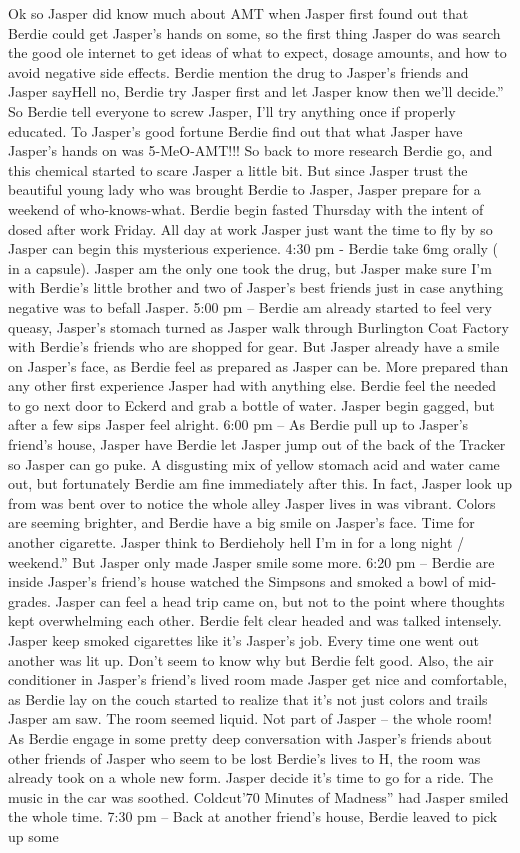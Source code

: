 \documentclass[12pt]{book}
\begin{document}
Ok so Jasper did know much about AMT when Jasper first found out that Berdie could get Jasper's hands on some, so the first thing Jasper do was search the good ole internet to get ideas of what to expect, dosage amounts, and how to avoid negative side effects. Berdie mention the drug to Jasper's friends and Jasper sayHell no, Berdie try Jasper first and let Jasper know then we'll decide.'' So Berdie tell everyone to screw Jasper, I'll try anything once if properly educated. To Jasper's good fortune Berdie find out that what Jasper have Jasper's hands on was 5-MeO-AMT!!! So back to more research Berdie go, and this chemical started to scare Jasper a little bit. But since Jasper trust the beautiful young lady who was brought Berdie to Jasper, Jasper prepare for a weekend of who-knows-what. Berdie begin fasted Thursday with the intent of dosed after work Friday. All day at work Jasper just want the time to fly by so Jasper can begin this mysterious experience. 4:30 pm - Berdie take 6mg orally ( in a capsule). Jasper am the only one took the drug, but Jasper make sure I'm with Berdie's little brother and two of Jasper's best friends just in case anything negative was to befall Jasper. 5:00 pm -- Berdie am already started to feel very queasy, Jasper's stomach turned as Jasper walk through Burlington Coat Factory with Berdie's friends who are shopped for gear. But Jasper already have a smile on Jasper's face, as Berdie feel as prepared as Jasper can be. More prepared than any other first experience Jasper had with anything else. Berdie feel the needed to go next door to Eckerd and grab a bottle of water. Jasper begin gagged, but after a few sips Jasper feel alright. 6:00 pm -- As Berdie pull up to Jasper's friend's house, Jasper have Berdie let Jasper jump out of the back of the Tracker so Jasper can go puke. A disgusting mix of yellow stomach acid and water came out, but fortunately Berdie am fine immediately after this. In fact, Jasper look up from was bent over to notice the whole alley Jasper lives in was vibrant. Colors are seeming brighter, and Berdie have a big smile on Jasper's face. Time for another cigarette. Jasper think to Berdieholy hell I'm in for a long night / weekend.'' But Jasper only made Jasper smile some more. 6:20 pm -- Berdie are inside Jasper's friend's house watched the Simpsons and smoked a bowl of mid-grades. Jasper can feel a head trip came on, but not to the point where thoughts kept overwhelming each other. Berdie felt clear headed and was talked intensely. Jasper keep smoked cigarettes like it's Jasper's job. Every time one went out another was lit up. Don't seem to know why but Berdie felt good. Also, the air conditioner in Jasper's friend's lived room made Jasper get nice and comfortable, as Berdie lay on the couch started to realize that it's not just colors and trails Jasper am saw. The room seemed liquid. Not part of Jasper -- the whole room! As Berdie engage in some pretty deep conversation with Jasper's friends about other friends of Jasper who seem to be lost Berdie's lives to H, the room was already took on a whole new form. Jasper decide it's time to go for a ride. The music in the car was soothed. Coldcut'70 Minutes of Madness'' had Jasper smiled the whole time. 7:30 pm -- Back at another friend's house, Berdie leaved to pick up some 
\end{document}
